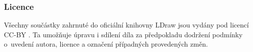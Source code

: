 

    \subsubsection*{Licence}\label{ldraw-licence}
    Všechny součástky zahrnuté do oficiální knihovny LDraw jsou vydány pod licencí \gls{CC-BY} \autocite{CC-BY}. Ta umožňuje úpravu i sdílení díla za předpokladu dodržení podmínky o~uvedení autora, licence a označení případných provedených změn.

    
